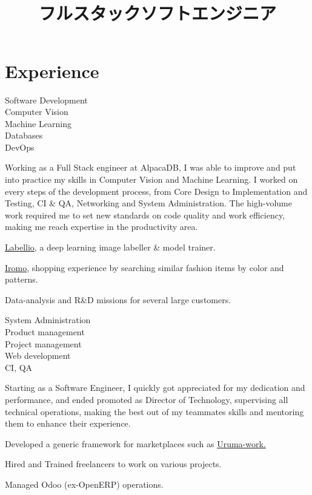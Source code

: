 \documentclass[a4paper,11pt]{cv4tw}%
\title{\\ フルスタックソフトエンジニア}
\begin{document}
\section{Experience}
{Software Development\\Computer Vision\\ Machine Learning\\Databases\\DevOps}
    { Working as a Full Stack engineer at AlpacaDB, I was able to improve and put
      into practice my skills in Computer Vision and Machine Learning. I
      worked on every steps of the development process, from Core Design to
      Implementation and Testing, CI \& QA, Networking and System Administration.
      The high-volume work required me to set new standards on code quality and work
      efficiency, making me reach expertise in the productivity area.
	\begin{missions}
        \item \underline{\href{http://www.labell.io/}{Labellio}}, a deep
            learning image labeller \& model trainer.
        \item \underline{\href{http://iromo.jp}{Iromo}}, shopping experience by
            searching similar fashion items by color and patterns.
        \item Data-analysis and R\&D missions for several large customers.
	\end{missions}
}
{System Administration\\Product management\\Project management\\Web
development\\CI, QA}
	{ Starting as a Software Engineer, I quickly got appreciated for my
      dedication and performance, and ended promoted as Director of
      Technology, supervising all technical operations, making the best out of
      my teammates skills and mentoring them to enhance their experience.
	\begin{missions}
        \item Developed a generic framework for marketplaces such as
            \underline{\href{https://uruma-work.com}{Uruma-work}.}
        \item Hired and Trained freelancers to work on various projects.
        \item Managed Odoo (ex-OpenERP) operations.
	\end{missions}
}
\end{document}
